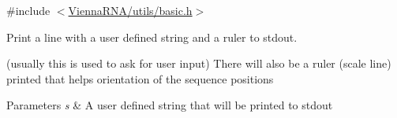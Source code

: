 {\ttfamily \#include $<$\hyperlink{utils_2basic_8h}{Vienna\+R\+N\+A/utils/basic.\+h}$>$}



Print a line with a user defined string and a ruler to stdout. 

(usually this is used to ask for user input) There will also be a ruler (scale line) printed that helps orientation of the sequence positions


\begin{DoxyParams}{Parameters}
{\em s} & A user defined string that will be printed to stdout \\
\hline
\end{DoxyParams}
